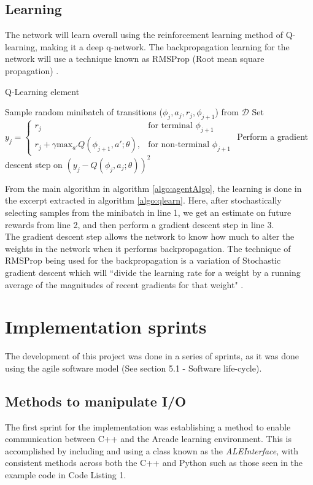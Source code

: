 \documentclass[10pt]{article}
\begin{document}
	\subsection{Learning}
		The network will learn overall using the reinforcement learning method of Q-learning, making it a deep q-network. The backpropagation learning for the network will use a technique known as RMSProp (Root mean square propagation) \cite{rms}.
		\begin{algorithm}
			\caption{Q-Learning element \cite{humanlevel}}
			\label{algo:qlearn}
			\begin{algorithmic}[1]
				\State Sample random minibatch of transitions ($\phi_j,a_j,r_j,\phi_{j+1}$) from $\mathcal{D}$
				\State Set $y_j =
					\begin{cases}
   						r_j& \text{for terminal } \phi_{j+1}\\
    					r_j + \gamma \text{max}_{a'}Q(\phi_{j+1},a';\theta),& \text{for non-terminal } \phi_{j+1}
					\end{cases}$
				\State Perform a gradient descent step on $(y_j - Q(\phi_j,a_j;\theta))^2$
			\end{algorithmic}
		\end{algorithm}
		
		From the main algorithm in algorithm \ref{algo:agentAlgo}, the learning is done in the excerpt extracted in algorithm \ref{algo:qlearn}. Here, after stochastically selecting samples from the minibatch in line 1, we get an estimate on future rewards from line 2, and then perform a gradient descent step in line 3.\\
		
		The gradient descent step allows the network to know how much to alter the weights in the network when it performs backpropagation. The technique of RMSProp being used for the backpropagation is a variation of Stochastic gradient descent which will ``divide the learning rate for a weight by a running average of the magnitudes of recent gradients for that weight" \cite{rms}.
	
	\bigskip

\section{Implementation sprints}
	The development of this project was done in a series of sprints, as it was done using the agile software model (See section 5.1 - Software life-cycle).
	
	\subsection{Methods to manipulate I/O}
		The first sprint for the implementation was establishing a method to enable communication between C++ and the Arcade learning environment. This is accomplished by including and using a class known as the \textit{ALEInterface}, with consistent methods across both the C++ and Python such as those seen in the example code in Code Listing 1.\\
		
\end{document}
